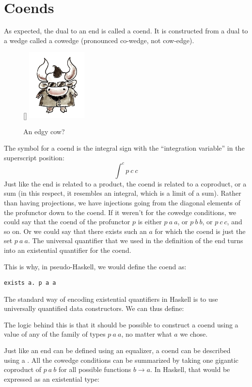 \section{Coends}
As expected, the dual to an end is called a coend. It is constructed
from a dual to a wedge called a cowedge (pronounced co-wedge, not
cow-edge).

\begin{figure}
\raisebox{0pt}[\dimexpr{}\baselineskip\relax]{
\includegraphics[width=30mm]{images/end-31.jpg}}%
\caption{An edgy cow?}
\end{figure}

The symbol for a coend is the integral sign with the ``integration
variable'' in the superscript position:
\[\int^c p\ c\ c\]
Just like the end is related to a product, the coend is related to a
coproduct, or a sum (in this respect, it resembles an integral, which is
a limit of a sum). Rather than having projections, we have injections
going from the diagonal elements of the profunctor down to the coend. If
it weren't for the cowedge conditions, we could say that the coend of
the profunctor $p$ is either $p\ a\ a$, or
$p\ b\ b$, or $p\ c\ c$, and so on. Or we could say that
there exists such an $a$ for which the coend is just the set
$p\ a\ a$. The universal quantifier that we used in the
definition of the end turns into an existential quantifier for the
coend.

This is why, in pseudo-Haskell, we would define the coend as:

\begin{Verbatim}
exists a. p a a
\end{Verbatim}
The standard way of encoding existential quantifiers in Haskell is to
use universally quantified data constructors. We can thus define:

The logic behind this is that it should be possible to construct a coend
using a value of any of the family of types $p\ a\ a$, no matter
what $a$ we chose.

Just like an end can be defined using an equalizer, a coend can be
described using a . All the cowedge conditions can be
summarized by taking one gigantic coproduct of $p\ a\ b$ for all
possible functions $b \to a$. In Haskell, that would be
expressed as an existential type:

